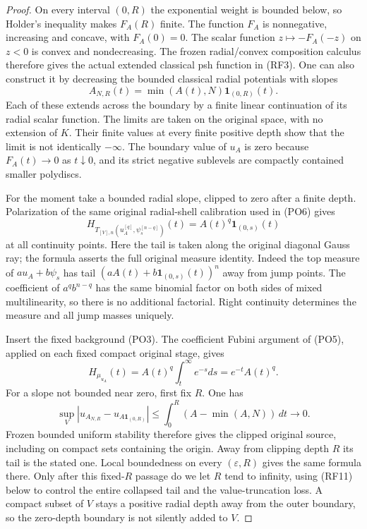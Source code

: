 \begin{proof}
On every interval $(0,R)$ the exponential weight is bounded
below, so Holder's inequality makes $F_A(R)$ finite.
The function $F_A$ is nonnegative, increasing and concave,
with $F_A(0)=0$.  The scalar function
$z\mapsto-F_A(-z)$ on $z<0$ is convex and nondecreasing.
The frozen radial/convex composition calculus therefore gives
the actual extended classical psh function in \textup{(RF3)}.
One can also construct it by decreasing the bounded classical
radial potentials with slopes
\[
                  A_{N,R}(t)=\min(A(t),N)\mathbf1_{(0,R)}(t).
 \tag{RF8}
\]
Each of these extends across the boundary by a finite linear
continuation of its radial scalar function.  The limits are
taken on the original space, with no extension of $K$.
Their finite values at every finite positive depth show
that the limit is not identically $-\infty$.  The boundary value of $u_A$ is zero
because $F_A(t)\to0$ as $t\downarrow0$, and its strict
negative sublevels are compactly contained smaller polydiscs.

For the moment take a bounded radial slope, clipped to zero
after a finite depth.  Polarization of the same original
radial-shell calibration used in \textup{(PO6)} gives
\[
 H_{T_{[V],n}(u_A^{[q]},\psi_s^{[n-q]})}(t)
                      =A(t)^q\mathbf1_{(0,s)}(t)
 \tag{RF9}
\]
at all continuity points.  Here the tail is taken along the
original diagonal Gauss ray; the formula asserts the full
original measure identity.  Indeed the top measure of
$a u_A+b\psi_s$ has tail
$(aA(t)+b\mathbf1_{(0,s)}(t))^n$ away from jump points.
The coefficient of $a^qb^{n-q}$ has the same binomial
factor on both sides of mixed multilinearity, so there is
no additional factorial.  Right continuity determines the
measure and all jump masses uniquely.

Insert the fixed background \textup{(PO3)}.  The coefficient
Fubini argument of \textup{(PO5)}, applied on each fixed
compact original stage, gives
\[
          H_{\mu_{u_A}}(t)
                =A(t)^q\int_t^\infty e^{-s}ds
                =e^{-t}A(t)^q.
 \tag{RF10}
\]
For a slope not bounded near zero, first fix $R$.  One has
\[
 \sup_V\left|u_{A_{N,R}}-u_{A\mathbf1_{(0,R)}}\right|
        \le\int_0^R(A-\min(A,N))\,dt\longrightarrow0.
\]
Frozen bounded uniform stability therefore gives the
clipped original source, including on compact sets
containing the origin.  Away from clipping depth $R$
its tail is the stated one.  Local boundedness on
every $(\varepsilon,R)$ gives the same formula there.
Only after this fixed-$R$ passage do we let $R$ tend
to infinity, using \textup{(RF11)} below to control
the entire collapsed tail and the value-truncation loss.
A compact subset of $V$ stays a positive radial depth
away from the outer boundary, so the zero-depth boundary
is not silently added to $V$.


\end{proof}
